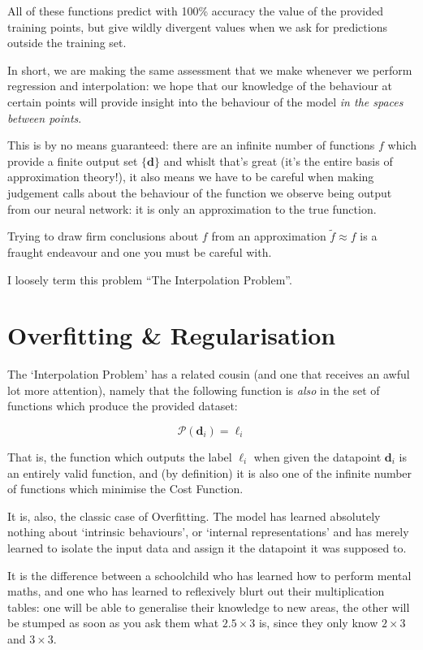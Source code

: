 \documentclass[a4paper,openany,11pt]{book}
\renewcommand\vec[1]{\boldsymbol{\mathbf{#1}}}
\begin{document}
					All of these functions predict with 100\% accuracy the value of the provided training points, but give wildly divergent values when we ask for predictions outside the training set.

					In short, we are making the same assessment that we make whenever we perform regression and interpolation: we hope that our knowledge of the behaviour at certain points will provide insight into the behaviour of the model \textit{in the spaces between points}.

					This is by no means guaranteed: there are an infinite number of functions $f$ which provide a finite output set $\{ \vec{d} \}$ and whislt that's great (it's the entire basis of approximation theory!), it also means we have to be careful when making judgement calls about the behaviour of the function we observe being output from our neural network: it is only an approximation to the true function. 

					Trying to draw firm conclusions about $f$ from an approximation $\tilde{f} \approx f$ is a fraught endeavour and one you must be careful with.

					I loosely term this problem ``The Interpolation Problem''.

			\section{Overfitting \& Regularisation}

				The `Interpolation Problem' has a related cousin (and one that receives an awful lot more attention), namely that the following function is \textit{also} in the set of functions which produce the provided dataset:

				\begin{equation}
					\mathcal{P}(\vec{d}_i) = \ell_i
				\end{equation}

				That is, the function which outputs the label $\ell_i$ when given the datapoint $\vec{d}_i$ is an entirely valid function, and (by definition) it is also one of the infinite number of functions which minimise the Cost Function. 

				It is, also, the classic case of Overfitting. The model has learned absolutely nothing about `intrinsic behaviours', or `internal representations' and has merely learned to isolate the input data and assign it the datapoint it was supposed to. 

				It is the difference between a schoolchild who has learned how to perform mental maths, and one who has learned to reflexively blurt out their multiplication tables: one will be able to generalise their knowledge to new areas, the other will be stumped as soon as you ask them what $2.5 \times 3$ is, since they only know $2\times3$ and $3 \times 3$.
\end{document}
